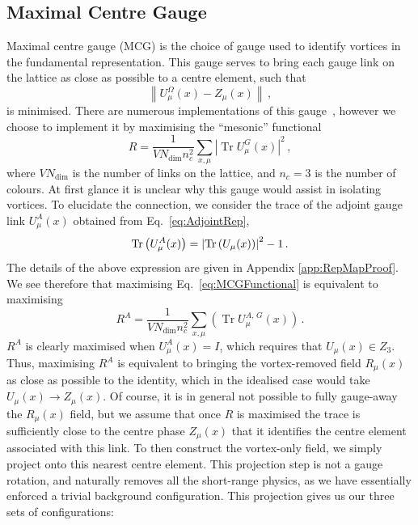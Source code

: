 \subsection{Maximal Centre Gauge}\label{sec:MCG}
Maximal centre gauge (MCG) is the choice of gauge used to identify vortices in the fundamental representation. This gauge serves to bring each gauge link on the lattice as close as possible to a centre element, such that
%
\begin{equation}
\left\| U _ { \mu } ^ { \Omega } ( x ) - Z _ { \mu } ( x ) \right\|\, ,
\end{equation}
%
is minimised. There are numerous implementations of this gauge~\cite{Montero:1999by,Faber:1999sq}, however we choose to implement it by maximising the ``mesonic'' functional~\cite{Langfeld:2003ev}
%
\begin{equation}
R = \frac { 1 } { V N _ { \operatorname { dim } } n _ { c } ^ { 2 } } \sum _ { x , \mu } \left| \operatorname { Tr } U _ { \mu } ^ { G } ( x ) \right| ^ { 2 }\, ,
\label{eq:MCGFunctional}
\end{equation} 
%
where $VN _ { \operatorname { dim } }$ is the number of links on the lattice, and $n_c=3$ is the number of colours. At first glance it is unclear why this gauge would assist in isolating vortices. To elucidate the connection, we consider the trace of the adjoint gauge link $U^A_\mu(x)$ obtained from Eq.~\eqref{eq:AdjointRep},
%
\begin{equation}
\operatorname{Tr}\left(U^A_\mu(x)\right) = \left|\operatorname{Tr}\left(U_\mu(x)\right)\right|^2 - 1\, .
\end{equation}
%
The details of the above expression are given in Appendix \ref{app:RepMapProof}. We see therefore that maximising Eq.~\eqref{eq:MCGFunctional} is equivalent to maximising
%
\begin{equation}
R^A = \frac { 1 } { V N _ { \operatorname { dim } } n _ { c } ^ { 2 } } \sum _ { x , \mu } \left( \operatorname { Tr } U _ { \mu } ^ { A,\,G } ( x ) \right)\, .
\end{equation}
%
$R^A$ is clearly maximised when $U_\mu^A(x)=I$, which requires that $U_\mu(x) \in Z_3$. Thus, maximising $R^A$ is equivalent to bringing the vortex-removed field $R_\mu(x)$ as close as possible to the identity, which in the idealised case would take $U_\mu(x)\rightarrow Z_\mu(x)$. Of course, it is in general not possible to fully gauge-away the $R_\mu(x)$ field, but we assume that once $R$ is maximised the trace is sufficiently close to the centre phase $Z_\mu(x)$ that it identifies the centre element associated with this link. To then construct the vortex-only field, we simply project onto this nearest centre element. This projection step is not a gauge rotation, and naturally removes all the short-range physics, as we have essentially enforced a trivial background configuration. This projection gives us our three sets of configurations:
